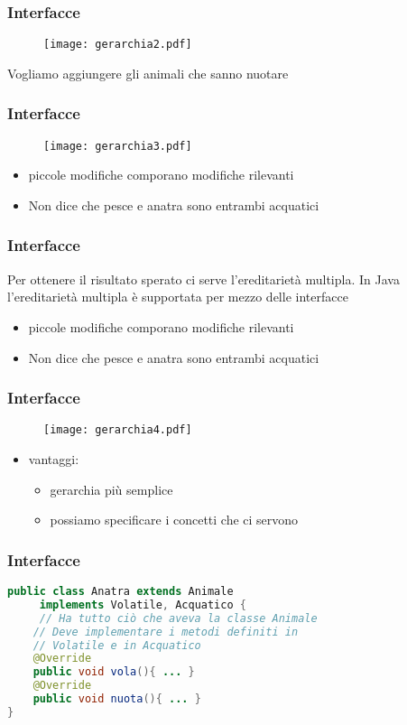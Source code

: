 \documentclass{beamer}
\begin{document}
\begin{frame}[fragile]
\frametitle{Interfacce}
\begin{figure}[h!]
  \centering
    \texttt{[image: gerarchia2.pdf]}
\end{figure}
Vogliamo aggiungere gli animali che sanno nuotare
\end{frame}


\begin{frame}[fragile]
\frametitle{Interfacce}
\begin{figure}[h!]
  \centering
    \texttt{[image: gerarchia3.pdf]}
\end{figure}
\begin{itemize}
\item  piccole modifiche comporano modifiche rilevanti
\item Non dice che pesce e anatra sono entrambi acquatici
\end{itemize}
\end{frame}

\begin{frame}[fragile]
\frametitle{Interfacce}
Per ottenere il risultato sperato ci serve l'ereditariet\`a multipla. In Java l'ereditariet\`a multipla \`e supportata per mezzo delle interfacce
\begin{itemize}
\item  piccole modifiche comporano modifiche rilevanti
\item Non dice che pesce e anatra sono entrambi acquatici
\end{itemize}
\end{frame}

\begin{frame}[fragile]
\frametitle{Interfacce}
\begin{figure}[h!]
  \centering
    \texttt{[image: gerarchia4.pdf]}
\end{figure}
\begin{itemize}
\item vantaggi:
\begin{itemize}
\item gerarchia pi\`u semplice
\item possiamo specificare i concetti che ci servono
\end{itemize}
\end{itemize}
\end{frame}

\begin{frame}[fragile]
\frametitle{Interfacce}
\begin{lstlisting}[language=Java,escapechar=|]
public class Anatra extends Animale
     implements Volatile, Acquatico { 
     // Ha tutto ciò che aveva la classe Animale
    // Deve implementare i metodi definiti in 
    // Volatile e in Acquatico 
    @Override
    public void vola(){ ... }
    @Override    
    public void nuota(){ ... } 
}
\end{lstlisting}
\end{frame}
\end{document}
